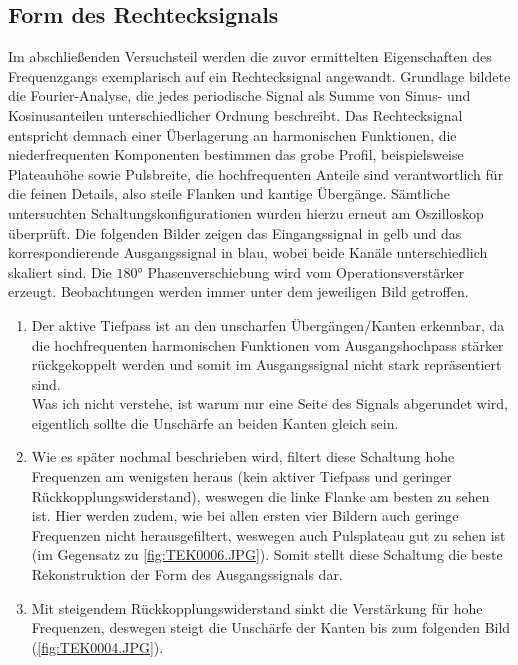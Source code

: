 \subsection{Form des Rechtecksignals}
Im abschließenden Versuchsteil werden die zuvor ermittelten Eigenschaften des Frequenzgangs exemplarisch auf ein Rechtecksignal angewandt. Grundlage bildete die Fourier-Analyse, die jedes periodische Signal als Summe von Sinus- und Kosinusanteilen unterschiedlicher Ordnung beschreibt. Das Rechtecksignal entspricht demnach einer Überlagerung an harmonischen Funktionen, die niederfrequenten Komponenten bestimmen das grobe Profil, beispielsweise Plateauhöhe sowie Pulsbreite, die hochfrequenten Anteile sind verantwortlich für die feinen Details, also steile Flanken und kantige Übergänge. Sämtliche untersuchten Schaltungskonfigurationen wurden hierzu erneut am Oszilloskop überprüft. Die folgenden Bilder zeigen das Eingangssignal in gelb und das korrespondierende Ausgangssignal in blau, wobei beide Kanäle unterschiedlich skaliert sind. Die \(\ang{180}\) Phasenverschiebung wird vom Operationsverstärker erzeugt. Beobachtungen werden immer unter dem jeweiligen Bild getroffen.

\begin{enumerate}
    
\item Der aktive Tiefpass ist an den unscharfen Übergängen/Kanten erkennbar, da die hochfrequenten harmonischen Funktionen vom Ausgangshochpass stärker rückgekoppelt werden und somit im Ausgangssignal nicht stark repräsentiert sind. \\
Was ich nicht verstehe, ist warum nur eine Seite des Signals abgerundet wird, eigentlich sollte die Unschärfe an beiden Kanten gleich sein. 
\FloatBarrier
\item Wie es später nochmal beschrieben wird, filtert diese Schaltung hohe Frequenzen am wenigsten heraus (kein aktiver Tiefpass und geringer Rückkopplungswiderstand), weswegen die linke Flanke am besten zu sehen ist. Hier werden zudem, wie bei allen ersten vier Bildern auch geringe Frequenzen nicht herausgefiltert, weswegen auch Pulsplateau gut zu sehen ist (im Gegensatz zu \cref{fig:TEK0006.JPG}). Somit stellt diese Schaltung die beste Rekonstruktion der Form des Ausgangssignals dar.
\FloatBarrier
\item Mit steigendem Rückkopplungswiderstand sinkt die Verstärkung für hohe Frequenzen, deswegen steigt die Unschärfe der Kanten bis zum folgenden Bild (\cref{fig:TEK0004.JPG}).
\end{enumerate}
\newpage
